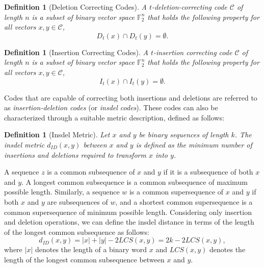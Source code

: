 \documentclass[11 pt]{article}
\numberwithin{equation}{section}
\newtheorem{definition}[theorem]{Definition}
\begin{document}
    \begin{definition}[Deletion Correcting Codes]\cite{levenshtein1965двоичные}
        A $t$-deletion-correcting code $\mathcal{C}$ of length $n$ is a subset of binary vector space $\mathbb{F}_2^n$ that holds the following property for all vectors $x,y \in \mathcal{C}$,
        $$D_t(x) \cap D_t(y) = \emptyset.$$     
    \end{definition}
        
    \begin{definition}[Insertion Correcting Codes]\cite{levenshtein1965двоичные}
        A $t$-insertion correcting code $\mathcal{C}$ of length $n$ is a subset of binary vector space $\mathbb{F}_2^n$ that holds the following property for all vectors $x,y \in \mathcal{C}$,
        $$I_t(x) \cap I_t(y) = \emptyset.$$
    \end{definition}
   Codes that are capable of correcting both insertions and deletions are referred to as \textit{insertion-deletion codes} (or \textit{insdel codes}). These codes can also be characterized through a suitable metric description, defined as follows:
 
    \begin{definition}[Insdel Metric]\cite{levenshtein1965двоичные}
        Let \( x \) and \( y \) be binary sequences of length \( k \). The insdel metric \( d_{ID}(x, y) \) between \( x \) and \( y \) is defined as the minimum number of insertions and deletions required to transform \( x \) into \( y \).
    \end{definition}
       
           
    A sequence $z$ is a common subsequence of $x$ and $y$ if it is a subsequence of both $x$ and $y$. A longest common subsequence is a common subsequence of maximum possible length. Similarly, a sequence $w$ is a common supersequence of $x$ and $y$ if both $x$ and $y$ are subsequences of $w$, and a shortest common supersequence is a common supersequence of minimum possible length.
    Considering only insertion and deletion operations, we can define the insdel distance in terms of the length of the longest common subsequence as follows:
    \begin{equation*}
        d_{ID}(x, y) = |x| + |y| - 2LCS(x,y) = 2k - 2LCS(x,y),
    \end{equation*}
     where $|x|$ denotes the length of a binary word $x$ and $LCS(x,y)$ denotes the length of the longest common subsequence between $x$ and $y$.
\end{document}
